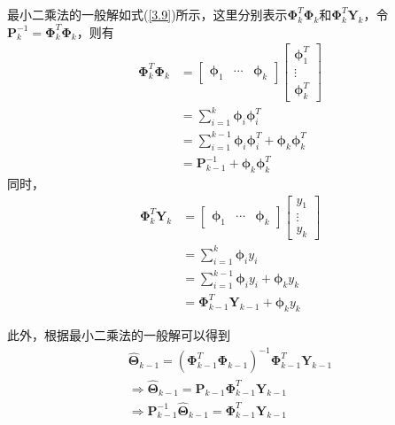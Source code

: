 最小二乘法的一般解如式(\ref{3.9})所示，这里分别表示$\symbf{\Phi}_{k}^{T} \symbf{\Phi}_{k}$和$\symbf{\Phi}_{k}^{T} \symbf{Y}_{k}$，令$\symbf{P}_{k}^{-1}=\symbf{\Phi}_{k}^{T} \symbf{\Phi}_{k}$，则有
\begin{equation}
\label{公式1}
\begin{aligned}
\symbf{\Phi}_{k}^{T} \symbf{\Phi}_{k}&=\left[\begin{matrix}
\symbf{\phi}_{1} & \cdots & \symbf{\phi}_{k}
\end{matrix}\right]\left[\begin{matrix}
\symbf{\phi}_{1}^{T} \\
\vdots \\
\symbf{\phi}_{k}^{T}
\end{matrix}\right]\\
&=\sum_{i=1}^{k} \symbf{\phi}_{i} \symbf{\phi}_{i}^{T}\\
&=\sum_{i=1}^{k-1} \symbf{\phi}_{i} \symbf{\phi}_{i}^{T}+\symbf{\phi}_{k} \symbf{\phi}_{k}^{T}\\
&=\symbf{P}_{k-1}^{-1}+\symbf{\phi}_{k} \symbf{\phi}_{k}^{T}
\end{aligned}
\end{equation}
同时，
\begin{equation}
\label{公式2}
\begin{aligned}
\symbf{\Phi}_{k}^{T} \symbf{Y}_{k}&=\left[\begin{matrix}
\symbf{\phi}_{1} & \cdots & \symbf{\phi}_{k}
\end{matrix}\right]\left[\begin{matrix}
y_{1} \\
\vdots \\
y_{k}
\end{matrix}\right]\\
&=\sum_{i=1}^{k} \symbf{\phi}_{i} y_{i}\\
&=\sum_{i=1}^{k-1} \symbf{\phi}_{i} y_{i}+\symbf{\phi}_{k} y_{k}\\
&=\symbf{\Phi}_{k-1}^{T} \symbf{Y}_{k-1}+\symbf{\phi}_{k} y_{k}
\end{aligned}
\end{equation}

此外，根据最小二乘法的一般解可以得到
\begin{equation}
\label{公式3}
\begin{matrix}
\hat{\symbf{\Theta}}_{k-1}=\left(\symbf{\Phi}_{k-1}^{T} \symbf{\Phi}_{k-1}\right)^{-1} \symbf{\Phi}_{k-1}^{T} \symbf{Y}_{k-1} \\
\Rightarrow \hat{\symbf{\Theta}}_{k-1}=\symbf{P}_{k-1} \symbf{\Phi}_{k-1}^{T} \symbf{Y}_{k-1} \\
\Rightarrow \symbf{P}_{k-1}^{-1} \hat{\symbf{\Theta}}_{k-1}=\symbf{\Phi}_{k-1}^{T} \symbf{Y}_{k-1}
\end{matrix}
\end{equation}

